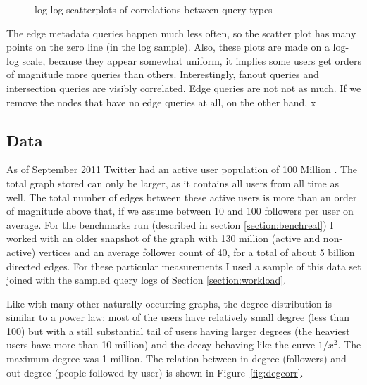 \begin{figure}
\caption{log-log scatterplots of correlations between query types}
\label{fig:querycorr}
\end{figure}

The edge metadata queries happen much less often, so the scatter plot has many points on the zero line (in the log sample). Also, these plots are made on a log-log scale, because they appear somewhat uniform, it implies some users get orders of magnitude more queries than others.   Interestingly, fanout queries and intersection queries are visibly correlated. Edge queries are not not as much. If we remove the nodes that have no edge queries at all, on the other hand, x

\subsection{Data}

As of September 2011 Twitter had an active user population of 100 Million \cite{twitter}.  The total graph stored can only be larger, as it contains all users from all time as well. The total number of edges between these active users is more than an order of magnitude above that, if we assume between 10 and 100 followers per user on average.   For the benchmarks run (described in section \ref{section:benchreal}) I worked with an older snapshot of the graph with 130 million (active and non-active) vertices and an average follower count of 40, for a total of about 5 billion directed edges. For these particular measurements I used a sample of this data set joined with the  sampled query logs of Section \ref{section:workload}.

Like with many other naturally occurring graphs, the degree distribution is similar to a power law: most of the users have relatively small degree (less than 100) but with a still substantial tail of users having larger degrees (the heaviest users have more than 10 million) and the decay behaving like the curve $1/x^2$. The maximum degree was 1 million.  The relation between in-degree (followers) and out-degree (people followed by user) is shown in Figure~\ref{fig:degcorr}.

